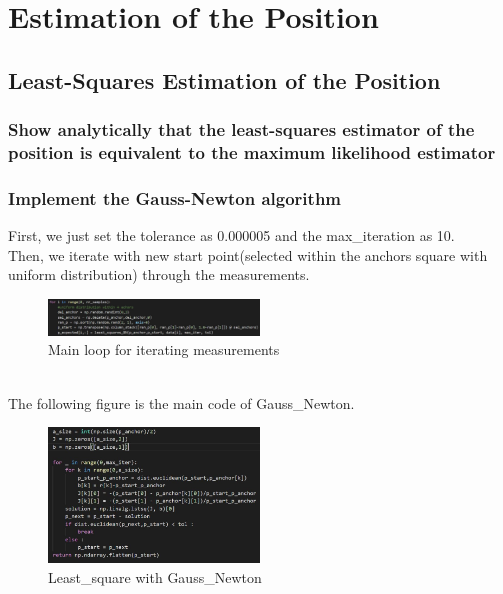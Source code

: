 \documentclass[a4paper]{article}
\begin{document}
\section{Estimation of the Position}
\subsection{Least-Squares Estimation of the Position}
\subsubsection{Show analytically that the least-squares estimator of the position is equivalent to the maximum likelihood estimator}
\subsubsection{Implement the Gauss-Newton algorithm}

First, we just set the tolerance as 0.000005 and the max\_iteration as 10.\\
Then, we iterate with new start point(selected within the anchors square with uniform distribution) through the measurements.
\begin{figure}[h]
	\begin{center}
		\includegraphics[width=0.5\textwidth]{gauss_newton.jpg}
		\caption{Main loop for iterating measurements}
	\end{center}
\end{figure}\\
The following figure is the main code of Gauss\_Newton.\\
\begin{figure}[h]
	\begin{center}
		\includegraphics[width=0.5\textwidth]{least_square.jpg}
		\caption{Least\_square with Gauss\_Newton}
	\end{center}
\end{figure}
\end{document}
